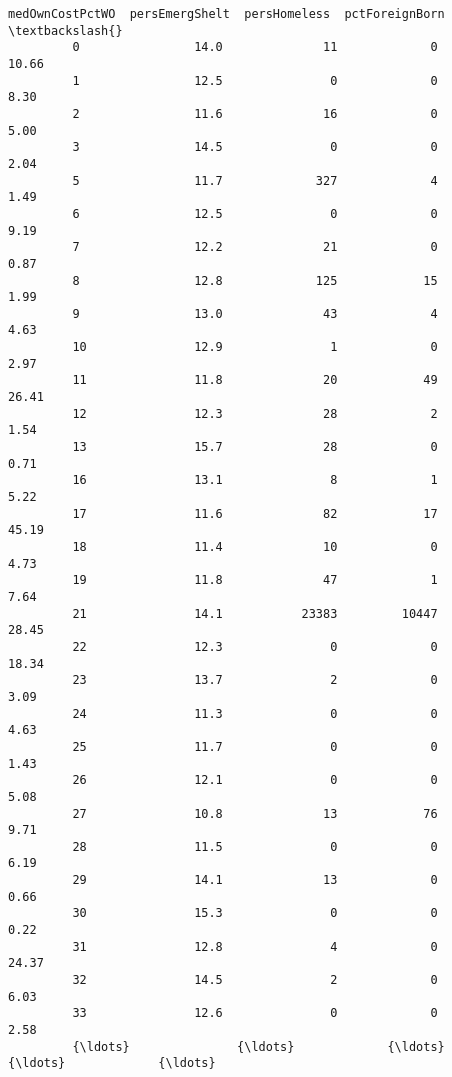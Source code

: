 \documentclass[11pt]{llncs}
\begin{document}
\begin{Verbatim}[commandchars=\\\{\}]
               medOwnCostPctWO  persEmergShelt  persHomeless  pctForeignBorn  \textbackslash{}
         0                14.0              11             0           10.66   
         1                12.5               0             0            8.30   
         2                11.6              16             0            5.00   
         3                14.5               0             0            2.04   
         5                11.7             327             4            1.49   
         6                12.5               0             0            9.19   
         7                12.2              21             0            0.87   
         8                12.8             125            15            1.99   
         9                13.0              43             4            4.63   
         10               12.9               1             0            2.97   
         11               11.8              20            49           26.41   
         12               12.3              28             2            1.54   
         13               15.7              28             0            0.71   
         16               13.1               8             1            5.22   
         17               11.6              82            17           45.19   
         18               11.4              10             0            4.73   
         19               11.8              47             1            7.64   
         21               14.1           23383         10447           28.45   
         22               12.3               0             0           18.34   
         23               13.7               2             0            3.09   
         24               11.3               0             0            4.63   
         25               11.7               0             0            1.43   
         26               12.1               0             0            5.08   
         27               10.8              13            76            9.71   
         28               11.5               0             0            6.19   
         29               14.1              13             0            0.66   
         30               15.3               0             0            0.22   
         31               12.8               4             0           24.37   
         32               14.5               2             0            6.03   
         33               12.6               0             0            2.58   
         {\ldots}               {\ldots}             {\ldots}           {\ldots}             {\ldots}   

\end{Verbatim}
\end{document}
